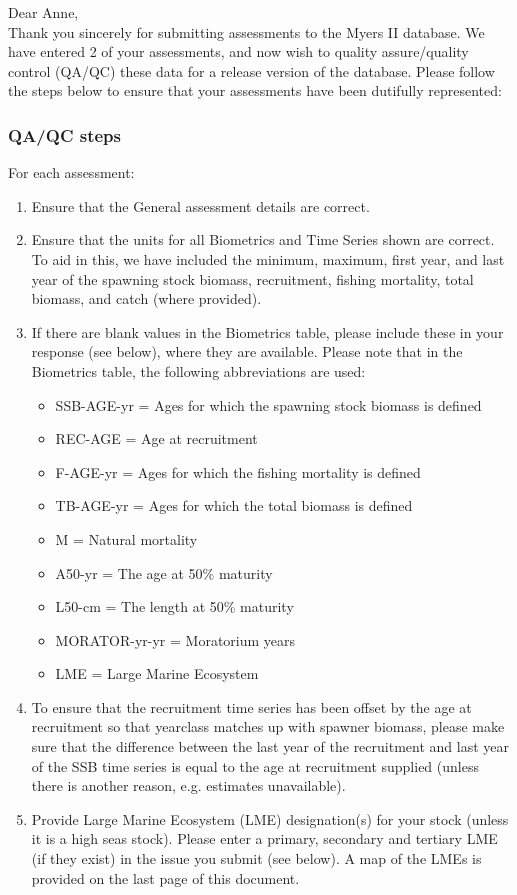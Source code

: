 \documentclass [a4paper, 10pt] {article}
\begin{document}
\noindent Dear Anne,\\

\noindent Thank you sincerely for submitting assessments to the Myers II database. We have entered 2 of your assessments, and now wish to quality assure/quality control (QA/QC) these data for a release version of the database. Please follow the steps below to ensure that your assessments have been dutifully represented:
\subsubsection{QA/QC steps}
For each assessment:
\begin{enumerate}
\item Ensure that the General assessment details are correct.
\item Ensure that the units for all Biometrics and Time Series shown are correct. To aid in this, we have included the minimum, maximum, first year, and last year of the spawning stock biomass, recruitment, fishing mortality, total biomass, and  catch  (where provided). 
\item If there are blank values in the Biometrics table, please include these in your response (see below), where they are available.
Please note that in the Biometrics table, the following abbreviations are used:
\begin{itemize}
\item SSB-AGE-yr  = Ages for which the spawning stock biomass is defined
\item REC-AGE     = Age at recruitment
\item F-AGE-yr    = Ages for which the fishing mortality is defined 
\item TB-AGE-yr   = Ages for which the total biomass is defined
\item M      = Natural mortality
\item A50-yr      = The age at 50\% maturity
\item L50-cm      = The length at 50\% maturity
\item MORATOR-yr-yr = Moratorium years
\item LME = Large Marine Ecosystem\\
\end{itemize}
\item To ensure that the recruitment time series has been offset by the age at recruitment so that yearclass matches up with spawner biomass, please make sure that the difference between the last year of the recruitment and last year of the SSB time series is equal to the age at recruitment supplied (unless there is another reason, e.g. estimates unavailable). 
\item Provide Large Marine Ecosystem (LME) designation(s) for your stock (unless it is a high seas stock). Please enter a primary, secondary and tertiary LME (if they exist) in the issue you submit (see below). A map of the LMEs is provided on the last page of this document. 
\end{enumerate}
\vspace{-.25in}
\end{document}
